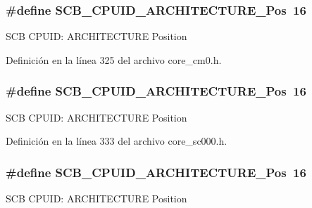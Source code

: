 \subsubsection[{\texorpdfstring{S\+C\+B\+\_\+\+C\+P\+U\+I\+D\+\_\+\+A\+R\+C\+H\+I\+T\+E\+C\+T\+U\+R\+E\+\_\+\+Pos}{SCB_CPUID_ARCHITECTURE_Pos}}]{\setlength{\rightskip}{0pt plus 5cm}\#define S\+C\+B\+\_\+\+C\+P\+U\+I\+D\+\_\+\+A\+R\+C\+H\+I\+T\+E\+C\+T\+U\+R\+E\+\_\+\+Pos~16}\hypertarget{group___c_m_s_i_s___s_c_b_gaf8b3236b08fb8e840efb682645fb0e98}{}\label{group___c_m_s_i_s___s_c_b_gaf8b3236b08fb8e840efb682645fb0e98}
S\+CB C\+P\+U\+ID\+: A\+R\+C\+H\+I\+T\+E\+C\+T\+U\+RE Position 

Definición en la línea 325 del archivo core\+\_\+cm0.\+h.

\subsubsection[{\texorpdfstring{S\+C\+B\+\_\+\+C\+P\+U\+I\+D\+\_\+\+A\+R\+C\+H\+I\+T\+E\+C\+T\+U\+R\+E\+\_\+\+Pos}{SCB_CPUID_ARCHITECTURE_Pos}}]{\setlength{\rightskip}{0pt plus 5cm}\#define S\+C\+B\+\_\+\+C\+P\+U\+I\+D\+\_\+\+A\+R\+C\+H\+I\+T\+E\+C\+T\+U\+R\+E\+\_\+\+Pos~16}\hypertarget{group___c_m_s_i_s___s_c_b_gaf8b3236b08fb8e840efb682645fb0e98}{}\label{group___c_m_s_i_s___s_c_b_gaf8b3236b08fb8e840efb682645fb0e98}
S\+CB C\+P\+U\+ID\+: A\+R\+C\+H\+I\+T\+E\+C\+T\+U\+RE Position 

Definición en la línea 333 del archivo core\+\_\+sc000.\+h.

\subsubsection[{\texorpdfstring{S\+C\+B\+\_\+\+C\+P\+U\+I\+D\+\_\+\+A\+R\+C\+H\+I\+T\+E\+C\+T\+U\+R\+E\+\_\+\+Pos}{SCB_CPUID_ARCHITECTURE_Pos}}]{\setlength{\rightskip}{0pt plus 5cm}\#define S\+C\+B\+\_\+\+C\+P\+U\+I\+D\+\_\+\+A\+R\+C\+H\+I\+T\+E\+C\+T\+U\+R\+E\+\_\+\+Pos~16}\hypertarget{group___c_m_s_i_s___s_c_b_gaf8b3236b08fb8e840efb682645fb0e98}{}\label{group___c_m_s_i_s___s_c_b_gaf8b3236b08fb8e840efb682645fb0e98}
S\+CB C\+P\+U\+ID\+: A\+R\+C\+H\+I\+T\+E\+C\+T\+U\+RE Position 

